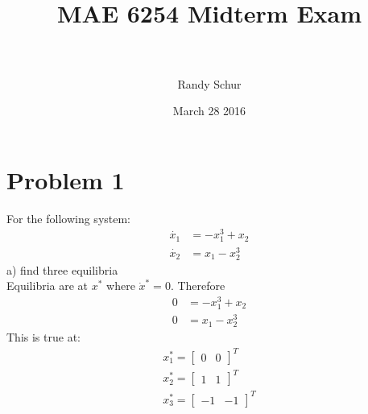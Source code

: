 \documentclass[paper=a4, fontsize=11pt]{scrartcl} %
\title{	
\normalfont \normalsize 
\horrule{0.5pt} \\[0.4cm] %
\huge MAE 6254 Midterm Exam \\ %
\horrule{2pt} \\[0.5cm] %
}
\author{Randy Schur} %
\date{\normalsize March 28 2016} %
\numberwithin{equation}{section} %
\numberwithin{figure}{section} %
\numberwithin{table}{section} %
\begin{document}
\maketitle %


\section{Problem 1}
For the following system: 
\begin{align*} 
\dot{x_1} &= -x_1^3 + x_2 \\
\dot{x_2} &= x_1 - x_2^3				
\end{align*}
a) find three equilibria \\

Equilibria are at $x^*$ where $\dot{x}^*=0$. Therefore 
\begin{align*}
0 &= -x_1^3 + x_2 \\
0 &= x_1 - x_2^3
\end{align*}
This is true at:
\begin{align}
x_1^* = \begin{bmatrix}0 & 0\end{bmatrix}^T \\
x_2^* = \begin{bmatrix}1 & 1\end{bmatrix}^T \\
x_3^* = \begin{bmatrix}-1 & -1\end{bmatrix}^T 
\end{align}
\end{document}
